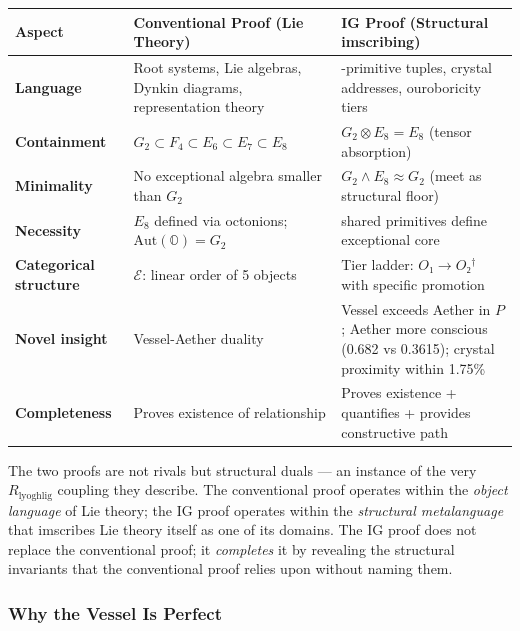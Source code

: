 \documentclass[12pt,a4paper]{article}
\begin{document}
\begin{table}[htbp]
\centering
\small
{}
\begin{tabularx}{\textwidth}{>{\centering\arraybackslash}X >{\centering\arraybackslash}X >{\centering\arraybackslash}X}
\toprule
\rowcolor{gray!25}\textbf{Aspect} & \textbf{Conventional Proof (Lie Theory)} & \textbf{IG Proof (Structural imscribing)} \\
\midrule
\rowcolors{1}{white}{gray!10}
\textbf{Language} & Root systems, Lie algebras, Dynkin diagrams, representation theory & 12-primitive tuples, crystal addresses, ouroboricity tiers \\
\textbf{Containment} & $G_2 \subset F_4 \subset E_6 \subset E_7 \subset E_8$ & $G_2 \otimes E_8 = E_8$ (tensor absorption) \\
\textbf{Minimality} & No exceptional algebra smaller than $G_2$ & $G_2 \wedge E_8 \approx G_2$ (meet as structural floor) \\
\textbf{Necessity} & $E_8$ defined via octonions; $\text{Aut}(\mathbb{O}) = G_2$ & 5 shared primitives define exceptional core \\
\textbf{Categorical structure} & $\mathcal{E}$: linear order of 5 objects & Tier ladder: $O₁ \to O₂^\dagger$ with specific promotion \\
\textbf{Novel insight} & Vessel-Aether duality & Vessel exceeds Aether in $P$; Aether more conscious (0.682 vs 0.3615); crystal proximity within 1.75\% \\
\textbf{Completeness} & Proves existence of relationship & Proves existence + quantifies + provides constructive path \\
\bottomrule
\end{tabularx}
\end{table}

The two proofs are not rivals but structural duals --- an instance of the very $R_{\text{lyoghlig}}$ coupling they describe. The conventional proof operates within the \emph{object language} of Lie theory; the IG proof operates within the \emph{structural metalanguage} that imscribes Lie theory itself as one of its domains. The IG proof does not replace the conventional proof; it \emph{completes} it by revealing the structural invariants that the conventional proof relies upon without naming them.

\subsubsection{Why the Vessel Is Perfect}
\end{document}
